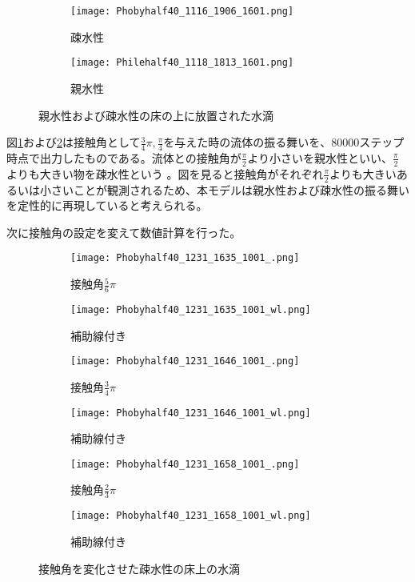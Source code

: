 \documentclass[]{jsarticle}
\begin{document}
\begin{figure}[H]
  \centering
  \begin{subfigure}{0.8\columnwidth}
    \centering
    \texttt{[image: Phobyhalf40\_1116\_1906\_1601.png]}
    \caption{疎水性}
    \label{fig:PhobyDrop}
  \end{subfigure}
  \begin{subfigure}{0.8\columnwidth}
    \centering
    \texttt{[image: Philehalf40\_1118\_1813\_1601.png]}
    \caption{親水性}
    \label{fig:PhileDrop}
  \end{subfigure}
  \caption{親水性および疎水性の床の上に放置された水滴}
  \label{fig:contactAngles}
\end{figure}

図\ref{fig:PhobyDrop}および\ref{fig:PhileDrop}は接触角として$\frac{3}{4}\pi, \frac{\pi}{4}$を与えた時の流体の振る舞いを、80000ステップ時点で出力したものである。流体との接触角が$\frac{\pi}{2}$より小さいを親水性といい、$\frac{\pi}{2}$よりも大きい物を疎水性という \cite{Truscott2012}。図を見ると接触角がそれぞれ$\frac{\pi}{2}$よりも大きいあるいは小さいことが観測されるため、本モデルは親水性および疎水性の振る舞いを定性的に再現していると考えられる。

次に接触角の設定を変えて数値計算を行った。
\begin{figure}[H]
  \centering
  \begin{subfigure}{0.4\columnwidth}
    \centering
    \texttt{[image: Phobyhalf40\_1231\_1635\_1001\_.png]}
    \caption{接触角$\frac{5}{6}\pi$}
    \label{fig:phoby_pi6}
  \end{subfigure}
  \begin{subfigure}{0.4\columnwidth}
    \centering
    \texttt{[image: Phobyhalf40\_1231\_1635\_1001\_wl.png]}
    \caption{補助線付き}
    \label{fig:phoby_pi6wl}
  \end{subfigure}

  \begin{subfigure}{0.4\columnwidth}
    \centering
    \texttt{[image: Phobyhalf40\_1231\_1646\_1001\_.png]}
    \caption{接触角$\frac{3}{4}\pi$}
    \label{fig:phoby_pi4}
  \end{subfigure}
  \begin{subfigure}{0.4\columnwidth}
    \centering
    \texttt{[image: Phobyhalf40\_1231\_1646\_1001\_wl.png]}
    \caption{補助線付き}
    \label{fig:phoby_pi4wl}
  \end{subfigure}
  \begin{subfigure}{0.4\columnwidth}
    \centering
    \texttt{[image: Phobyhalf40\_1231\_1658\_1001\_.png]}
    \caption{接触角$\frac{2}{3}\pi$}
    \label{fig:phoby_pi3}
  \end{subfigure}
  \begin{subfigure}{0.4\columnwidth}
    \centering
    \texttt{[image: Phobyhalf40\_1231\_1658\_1001\_wl.png]}
    \caption{補助線付き}
    \label{fig:phoby_pi3wl}
  \end{subfigure}

  \caption{接触角を変化させた疎水性の床上の水滴}
\end{figure}
\end{document}
